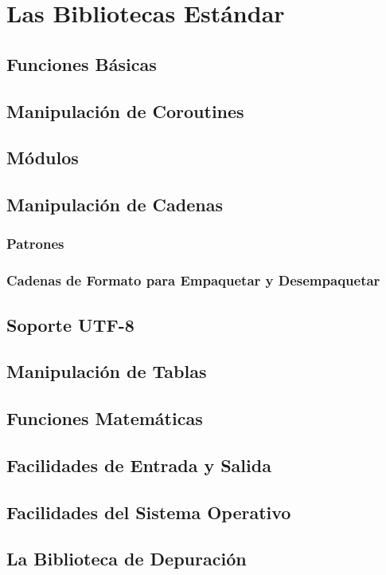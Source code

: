 \chapter{Las Bibliotecas Estándar}
\lipsum[1-2]

\section{Funciones Básicas}
\lipsum[1-2]

\section{Manipulación de Coroutines}
\lipsum[1-2]

\section{Módulos}
\lipsum[1-2]

\section{Manipulación de Cadenas}
\lipsum[1-2]

\subsection{Patrones}
\lipsum[1-2]

\subsection{Cadenas de Formato para Empaquetar y Desempaquetar}
\lipsum[1-2]

\section{Soporte UTF-8}
\lipsum[1-2]

\section{Manipulación de Tablas}
\lipsum[1-2]

\section{Funciones Matemáticas}
\lipsum[1-2]

\section{Facilidades de Entrada y Salida}
\lipsum[1-2]

\section{Facilidades del Sistema Operativo}
\lipsum[1-2]

\section{La Biblioteca de Depuración}
\lipsum[1-2]
